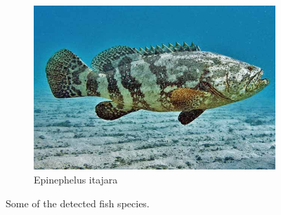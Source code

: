 \documentclass[10pt]{article}
\begin{document}
\begin{figure}
\begin{subfigure}[b]{0.45\textwidth}
         \includegraphics[width=\textwidth]{images/epinephelus_itajara.jpg}
         \caption{Epinephelus itajara}
     \end{subfigure}
     \caption{Some of the detected fish species.}
\end{figure}
\end{document}
